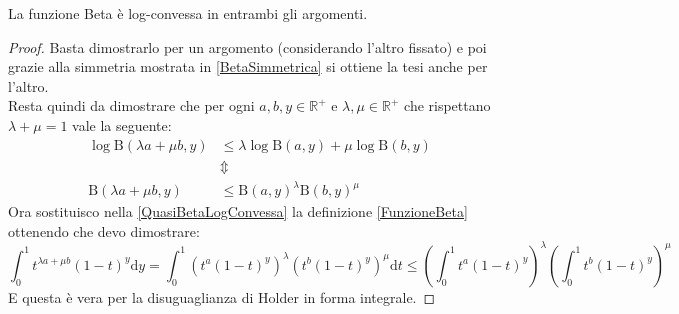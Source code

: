 \begin{lemma}\label{BetaLogConvessa} 
	La funzione Beta è log-convessa in entrambi gli argomenti.
\end{lemma}
\begin{proof}
	Basta dimostrarlo per un argomento (considerando l'altro fissato) e poi grazie alla simmetria mostrata in \ref{BetaSimmetrica}
	si ottiene la tesi anche per l'altro.\\
	Resta quindi da dimostrare che per ogni $a,b,y\in\mathbb{R^+}$ e $\lambda,\mu\in\mathbb{R^+}$ che rispettano $\lambda+\mu=1$ vale la seguente:
	\begin{equation}\begin{split}\label{QuasiBetaLogConvessa}
		\log \mathrm{B}(\lambda a+\mu b, y )  & \le \lambda \log \mathrm{B}(a, y ) + \mu\log \mathrm{B}( b, y )\\
		& \Updownarrow  \\
		\mathrm{B}(\lambda a+\mu b, y ) & \le  \mathrm{B}(a,y)^{\lambda}\mathrm{B}(b, y )^{\mu}
	\end{split}\end{equation}
	Ora sostituisco nella \eqref{QuasiBetaLogConvessa} la definizione \ref{FunzioneBeta} ottenendo che devo dimostrare:
	\begin{equation*}
		\int_{0}^1 t^{\lambda a+\mu b}(1-t)^y\mathrm{d}y=\int_{0}^1 \left(t^a(1-t)^y\right)^{\lambda}\left(t^b(1-t)^y\right)^{\mu}\mathrm{d}t \le
		\left(\int_{0}^1 t^a(1-t)^y\right)^{\lambda}\left(\int_{0}^1 t^b(1-t)^y\right)^{\mu}
	\end{equation*}
	E questa è vera per la disuguaglianza di Holder in forma integrale.

\end{proof}

